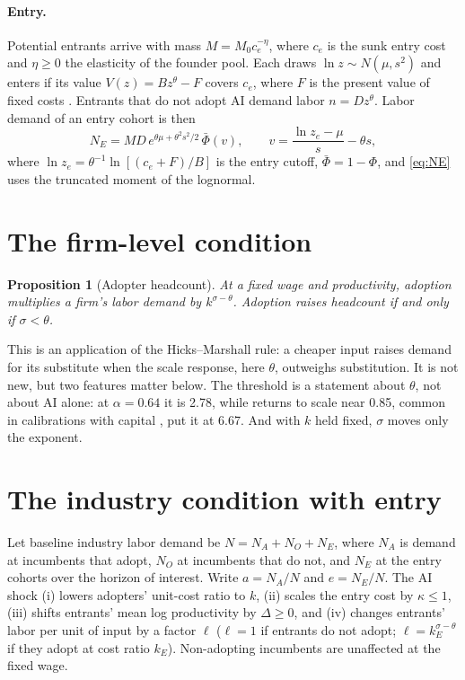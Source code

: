 \documentclass[11pt]{article}
\newtheorem{proposition}{Proposition}
\theoremstyle{remark}
\begin{document}
\paragraph{Entry.} Potential entrants arrive with mass $M = M_0 c_e^{-\eta}$, where $c_e$ is the sunk entry cost and $\eta \ge 0$ the elasticity of the founder pool. Each draws $\ln z \sim N(\mu, s^2)$ and enters if its value $V(z) = B z^{\theta} - F$ covers $c_e$, where $F$ is the present value of fixed costs \citep{hopenhayn1992entry}. Entrants that do not adopt AI demand labor $n = D z^{\theta}$. Labor demand of an entry cohort is then
\begin{equation}\label{eq:NE}
  N_E = M D \, e^{\theta\mu + \theta^2 s^2/2}\, \bar\Phi(v), \qquad v = \frac{\ln z_e - \mu}{s} - \theta s,
\end{equation}
where $\ln z_e = \theta^{-1}\ln[(c_e + F)/B]$ is the entry cutoff, $\bar\Phi = 1-\Phi$, and \eqref{eq:NE} uses the truncated moment of the lognormal.

\section{The firm-level condition}

\begin{proposition}[Adopter headcount]\label{prop:firm}
At a fixed wage and productivity, adoption multiplies a firm's labor demand by $k^{\sigma - \theta}$. Adoption raises headcount if and only if $\sigma < \theta$.
\end{proposition}

\noindent This is an application of the Hicks--Marshall rule: a cheaper input raises demand for its substitute when the scale response, here $\theta$, outweighs substitution. It is not new, but two features matter below. The threshold is a statement about $\theta$, not about AI alone: at $\alpha = 0.64$ it is 2.78, while returns to scale near 0.85, common in calibrations with capital \citep{atkeson2005modeling,restuccia2008policy}, put it at 6.67. And with $k$ held fixed, $\sigma$ moves only the exponent.

\section{The industry condition with entry}

Let baseline industry labor demand be $N = N_A + N_O + N_E$, where $N_A$ is demand at incumbents that adopt, $N_O$ at incumbents that do not, and $N_E$ at the entry cohorts over the horizon of interest. Write $a = N_A/N$ and $e = N_E/N$. The AI shock (i) lowers adopters' unit-cost ratio to $k$, (ii) scales the entry cost by $\kappa \le 1$, (iii) shifts entrants' mean log productivity by $\Delta \ge 0$, and (iv) changes entrants' labor per unit of input by a factor $\ell$ ($\ell = 1$ if entrants do not adopt; $\ell = k_E^{\sigma-\theta}$ if they adopt at cost ratio $k_E$). Non-adopting incumbents are unaffected at the fixed wage.
\end{document}
